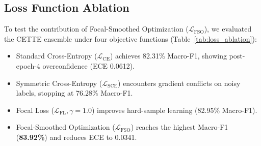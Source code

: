 \documentclass[10pt,conference]{IEEEtran}
\begin{document}
\subsection{Loss Function Ablation}
To test the contribution of Focal-Smoothed Optimization ($\mathcal{L}_{\text{FSO}}$), we evaluated the CETTE ensemble under four objective functions (Table~\ref{tab:loss_ablation}):
\begin{itemize}
    \item Standard Cross-Entropy ($\mathcal{L}_{\text{CE}}$) achieves 82.31\% Macro-F1, showing post-epoch-4 overconfidence (ECE 0.0612).
    \item Symmetric Cross-Entropy ($\mathcal{L}_{\text{SCE}}$) encounters gradient conflicts on noisy labels, stopping at 76.28\% Macro-F1.
    \item Focal Loss ($\mathcal{L}_{\text{FL}}, \gamma=1.0$) improves hard-sample learning (82.95\% Macro-F1).
    \item Focal-Smoothed Optimization ($\mathcal{L}_{\text{FSO}}$) reaches the highest Macro-F1 (\textbf{83.92\%}) and reduces ECE to 0.0341.
\end{itemize}

\begin{table}[t]
\caption{Loss function ablation on CETTE ensemble performance (CMTE-NITANP Split~B).}
\label{tab:loss_ablation}
\centering
\footnotesize
\setlength{\tabcolsep}{6pt}
\end{table}
\end{document}
